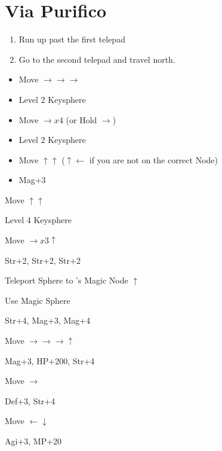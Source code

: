 \chapter{Via Purifico}

\begin{enumerate}
    \item Run up past the first telepad
    \item Go to the second telepad and travel north.
\end{enumerate}
\begin{spheregrid}
    \begin{itemize}
        \auronf
        \begin{itemize}
            \item Move $\rightarrow\rightarrow\rightarrow$
            \item Level 2 Keysphere
            \item Move $\rightarrow x4$ (or Hold $\rightarrow$)
            \item Level 2 Keysphere
            \item Move $\uparrow\uparrow$ ($\uparrow\leftarrow$ if you are not on the correct Node)
            \item Mag+3
        \end{itemize}
        \yunaf
        \begin{itemize}
            \begin{multicols}{2}
                \item Move $\uparrow\uparrow$
                \item Level 4 Keysphere
                \item Move $\rightarrow x3 \uparrow$
                \item Str+2, Str+2, Str+2
                \item Teleport Sphere to \auron's Magic Node $\uparrow$
                \item Use Magic Sphere
                \item Str+4, Mag+3, Mag+4
                \item Move $\rightarrow\rightarrow\rightarrow\uparrow$
                \item Mag+3, HP+200, Str+4
                \item Move $\rightarrow$
                \item Def+3, Str+4
                \item Move $\leftarrow\downarrow$
                \item Agi+3, MP+20

\end{multicols}
\end{itemize}
\end{itemize}
\end{spheregrid}
